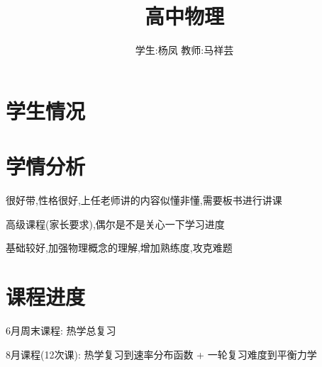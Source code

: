 \documentclass{article}
\title{高中物理}
\author{学生:\quad 杨凤 \quad 教师:\quad 马祥芸}
\begin{document}
\maketitle
\tableofcontents
\newpage
{}

\section{学生情况}
\begin{center}
\end{center}

\section{学情分析}
很好带,性格很好,上任老师讲的内容似懂非懂,需要板书进行讲课

高级课程(家长要求),偶尔是不是关心一下学习进度

基础较好,加强物理概念的理解,增加熟练度,攻克难题

\section{课程进度}

6月周末课程:
热学总复习

8月课程(12次课):
热学复习到速率分布函数 + 一轮复习难度到平衡力学
\end{document}

